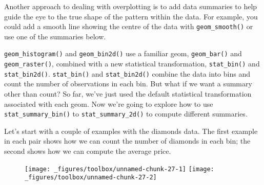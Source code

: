 Another approach to dealing with overplotting is to add data summaries
to help guide the eye to the true shape of the pattern within the data.
For example, you could add a smooth line showing the centre of the data
with \texttt{geom\_smooth()} or use one of the summaries below.


 

\texttt{geom\_histogram()} and \texttt{geom\_bin2d()} use a familiar
geom, \texttt{geom\_bar()} and \texttt{geom\_raster()}, combined with a
new statistical transformation, \texttt{stat\_bin()} and
\texttt{stat\_bin2d()}. \texttt{stat\_bin()} and \texttt{stat\_bin2d()}
combine the data into bins and count the number of observations in each
bin. But what if we want a summary other than count? So far, we've just
used the default statistical transformation associated with each geom.
Now we're going to explore how to use \texttt{stat\_summary\_bin()} to
\texttt{stat\_summary\_2d()} to compute different summaries.

Let's start with a couple of examples with the diamonds data. The first
example in each pair shows how we can count the number of diamonds in
each bin; the second shows how we can compute the average price.

\begin{Shaded}
\begin{Highlighting}[]
\StringTok{ }
\StringTok{  }\NormalTok{()}

\StringTok{ }
\StringTok{  }\NormalTok{(} \NormalTok{, } 
\end{Highlighting}
\end{Shaded}

\begin{figure}[H]
  \texttt{[image: \_figures/toolbox/unnamed-chunk-27-1]}%
  \texttt{[image: \_figures/toolbox/unnamed-chunk-27-2]}
\end{figure}

